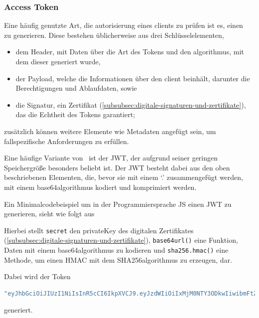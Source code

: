 \subsubsection[Access Token]{Access Token}\label{subsubsec:access-token}
Eine häufig genutzte Art, die \gls{autorisierung} eines \glspl{client} zu prüfen ist es, einen\  zu generieren.
Diese bestehen üblicherweise aus drei Schlüsselelementen,
\begin{itemize}
    \item dem Header, mit Daten über die Art des Tokens und den \gls{algorithmus}, mit dem dieser generiert wurde,
    \item der Payload, welche die Informationen über den \gls{client} beinhält, darunter \ua die Berechtigungen und Ablaufdaten, sowie
    \item die Signatur, ein Zertifikat (\autoref{subsubsec:digitale-signaturen-und-zertifikate}), das die Echtheit des Tokens garantiert;
\end{itemize}\label{itm:TokenElemente}
zusätzlich können weitere Elemente wie \zb Metadaten angefügt sein, um fallspezifische Anforderungen zu erfüllen.\autocite[\vglf][]{AccessTo39:online}

Eine häufige Variante von\  ist der \ac{JWT}, der aufgrund seiner geringen Speichergröße besonders beliebt ist.\autocite[\vglf][]{rfc7519} Der \ac{JWT} besteht dabei aus den oben beschriebenen Elementen, die, bevor sie mit einem `.' zusammengefügt werden, mit einem \gls{base64}\nonbreakdash \gls{algorithmus} kodiert und komprimiert werden.\autocite[\vglf][]{rfc7519}

Ein Minimalcodebeispiel um in der Programmiersprache \ac{JS} einen \ac{JWT} zu generieren, sieht wie folgt aus



Hierbei stellt \lstinline!secret! den \gls{privateKey}\autocite{rfc2104} des digitalen Zertifikates (\autoref{subsubsec:digitale-signaturen-und-zertifikate}), \lstinline!base64url()! eine Funktion, Daten mit einem \gls{base64}\nonbreakdash \gls{algorithmus} zu kodieren und \lstinline!sha256.hmac()! eine Methode, um einen \ac{HMAC} mit dem \gls{SHA256}\nonbreakdash\gls{algorithmus} zu erzeugen, dar.

Dabei wird der Token
\begin{lstlisting}[language = JavaScript,label={lst:jwt}]
"eyJhbGciOiJIUzI1NiIsInR5cCI6IkpXVCJ9.eyJzdWIiOiIxMjM0NTY3ODkwIiwibmFtZSI6IkpvaG4gRG9lIiwiaWF0IjoxNTE2MjM5MDIyfQ.SflKxwRJSMeKKF2QT4fwpMeJf36POk6yJV_adQssw5c"
\end{lstlisting}
generiert.

